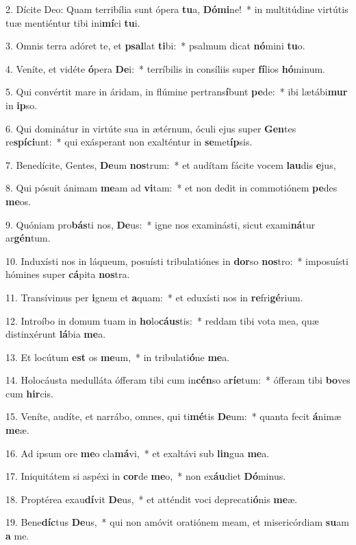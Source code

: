 2. Dícite Deo: Quam terribília sunt ópera \textbf{tu}a, \textbf{Dó}\textbf{mi}ne!~*  in multitúdine virtútis tuæ mentiéntur tibi ini\textbf{mí}ci \textbf{tu}i.\

3. Omnis terra adóret te, et \textbf{psal}lat \textbf{ti}bi:~*  psalmum dicat \textbf{nó}mini \textbf{tu}o.\

4. Veníte, et vidéte \textbf{ó}pera \textbf{De}i:~*  terríbilis in consíliis super \textbf{fí}lios \textbf{hó}minum.\

5. Qui convértit mare in áridam, in flúmine pertrans\textbf{í}bunt \textbf{pe}de:~*  ibi lætábi\textbf{mur} in \textbf{ip}so.\

6. Qui dominátur in virtúte sua in ætérnum, óculi ejus super \textbf{Gen}tes re\textbf{spí}\textbf{ci}unt:~*  qui exásperant non exalténtur in \textbf{se}met\textbf{íp}sis.\

7. Benedícite, Gentes, \textbf{De}um \textbf{nos}trum:~*  et audítam fácite vocem \textbf{lau}dis \textbf{e}jus,\

8. Qui pósuit ánimam \textbf{me}am ad \textbf{vi}tam:~*  et non dedit in commotiónem \textbf{pe}des \textbf{me}os.\

9. Quóniam pro\textbf{bás}ti nos, \textbf{De}us:~*  igne nos examinásti, sicut exami\textbf{ná}tur ar\textbf{gén}tum.\

10. Induxísti nos in láqueum, posuísti tribulatiónes in \textbf{dor}so \textbf{nos}tro:~*  imposuísti hómines super \textbf{cá}pita \textbf{nos}tra.\

11. Transívimus per \textbf{i}gnem et \textbf{a}quam:~*  et eduxísti nos in \textbf{re}fri\textbf{gé}rium.\

12. Introíbo in domum tuam in \textbf{ho}lo\textbf{cáus}tis:~*  reddam tibi vota mea, quæ distinxérunt \textbf{lá}bia \textbf{me}a.\

13. Et locútum \textbf{est} os \textbf{me}um,~*  in tribulati\textbf{ó}ne \textbf{me}a.\

14. Holocáusta medulláta ófferam tibi cum in\textbf{cén}so a\textbf{rí}\textbf{e}tum:~*  ófferam tibi \textbf{bo}ves cum \textbf{hir}cis.\

15. Veníte, audíte, et narrábo, omnes, qui ti\textbf{mé}tis \textbf{De}um:~*  quanta fecit \textbf{á}nimæ \textbf{me}æ.\

16. Ad ipsum ore \textbf{me}o cla\textbf{má}vi,~*  et exaltávi sub \textbf{lin}gua \textbf{me}a.\

17. Iniquitátem si aspéxi in \textbf{cor}de \textbf{me}o,~*  non ex\textbf{áu}diet \textbf{Dó}minus.\

18. Proptérea exau\textbf{dí}vit \textbf{De}us,~*  et atténdit voci deprecati\textbf{ó}nis \textbf{me}æ.\

19. Bene\textbf{díc}tus \textbf{De}us,~*  qui non amóvit oratiónem meam, et misericórdiam \textbf{su}am \textbf{a} me.\


